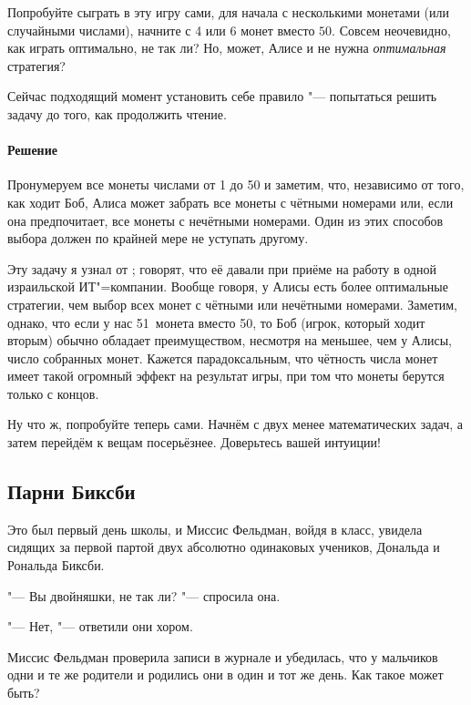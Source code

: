 \documentclass[twoside]{book}
\makeatletter
\newcommand{\rindex}[2][\imki@jobname]{%
  \index[#1]{\detokenize{#2}}%
}
\makeatother
\begin{document}
\medskip

Попробуйте сыграть в эту игру сами, для начала с несколькими монетами (или случайными числами), начните с 4 или 6 монет вместо $50$.
Совсем неочевидно, как играть оптимально, не так ли?
Но, может, Алисе и не нужна \emph{оптимальная} стратегия? 

Сейчас подходящий момент установить себе правило "--- попытаться решить задачу до того, как продолжить чтение.

\paragraph{Решение}
Пронумеруем все монеты числами от 1 до 50 и заметим, что, независимо от того, как ходит Боб, Алиса может забрать все монеты с чётными номерами или, если она предпочитает, все монеты с нечётными номерами.
Один из этих способов выбора должен по крайней мере не уступать другому.
\heart

Эту задачу я узнал от ;
говорят, что её давали при приёме на работу в одной израильской ИТ"=компании.
Вообще говоря, у Алисы есть более оптимальные стратегии, чем выбор всех монет с чётными или нечётными номерами.
Заметим, однако, что если у нас 51~монета вместо 50, то Боб (игрок, который ходит вторым) обычно обладает преимуществом, несмотря на меньшее, чем у Алисы, число собранных монет.
Кажется парадоксальным, что чётность числа монет имеет такой огромный эффект на результат игры, при том что монеты берутся только с концов.

\medskip

Ну что ж, попробуйте теперь сами.
Начнём с двух менее математических задач, а затем перейдём к вещам посерьёзнее.
Доверьтесь вашей интуиции!

\subsection*{Парни Биксби} %
\rindex{Парни Биксби}

Это был первый день школы, и Миссис Фельдман, войдя в класс, увидела сидящих за первой партой двух абсолютно одинаковых учеников, Дональда и Рональда Биксби.

"--- Вы двойняшки, не так ли? "--- спросила она.

"--- Нет, "--- ответили они хором.

Миссис Фельдман проверила записи в журнале и убедилась, что у мальчиков одни и те же родители и родились они в один и тот же день.
Как такое может быть?
\end{document}
